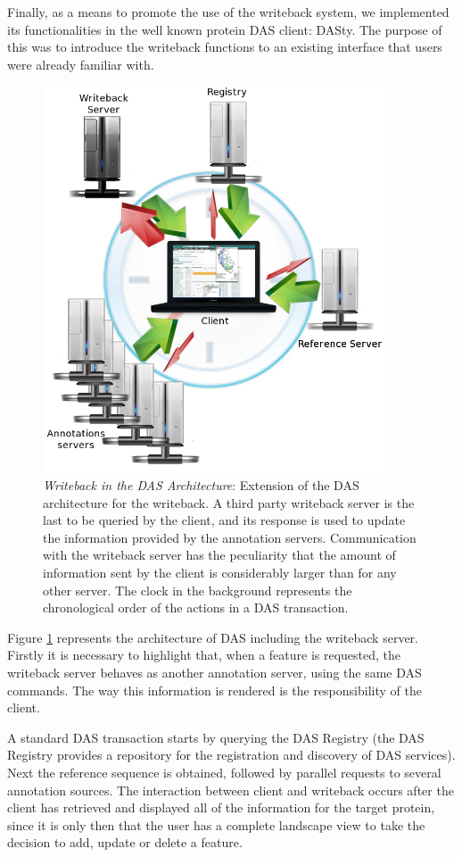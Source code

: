 Finally, as a means to promote the use of the writeback system, we implemented its functionalities in the well known protein DAS client: DASty. The purpose of this was to introduce the writeback functions to an existing interface that users were already familiar with.

\begin{figure}[ht] 
\centering
\includegraphics[width=4in]{figures/WritebackArchitecture.png} 
\caption[Writeback in the DAS Architecture]{\emph{Writeback in the DAS Architecture}: Extension of the DAS architecture for the writeback. A third party writeback server is the last to be queried by the client, and its response is used to update the information provided by the annotation servers. Communication with the writeback server has the peculiarity that the amount of information sent by the client is considerably larger than for any other server. The clock in the background represents the chronological order of the actions in a DAS transaction.}  \label{fig: WritebackArchitecture}
\end{figure}

Figure \ref{fig: WritebackArchitecture} represents the architecture of DAS including the writeback server. Firstly it is necessary to highlight that, when a feature is requested, the writeback server behaves as another annotation server, using the same DAS commands. The way this information is rendered is the responsibility of the client. 

A standard DAS transaction starts by querying the DAS Registry (the DAS Registry provides a repository for the registration and discovery of DAS services). Next the reference sequence is obtained, followed by parallel requests to several annotation sources. The interaction between client and writeback occurs after the client has retrieved and displayed all of the information for the target protein, since it is only then that the user has a complete landscape view to take the decision to add, update or delete a feature.

